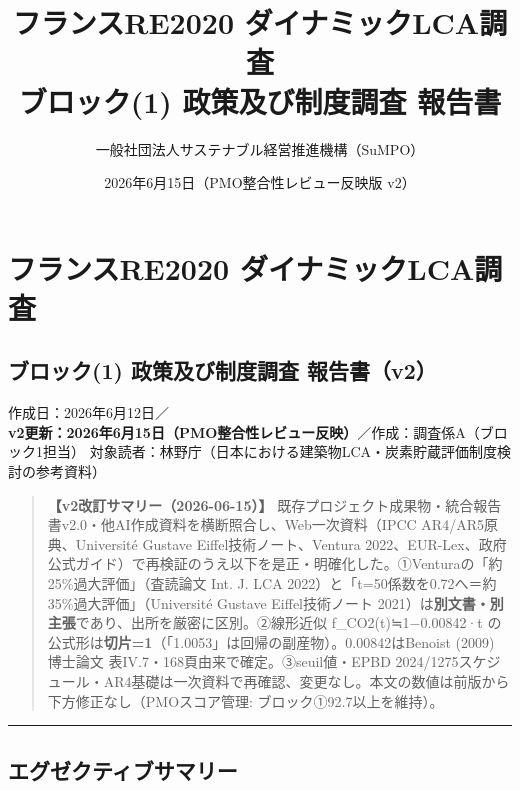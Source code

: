 \documentclass[11pt]{ltjsarticle}
\title{フランスRE2020 ダイナミックLCA調査\\ブロック(1) 政策及び制度調査 報告書}
\author{一般社団法人サステナブル経営推進機構（SuMPO）}
\date{2026年6月15日（PMO整合性レビュー反映版 v2）}
\begin{document}
\maketitle

\hypertarget{ux30d5ux30e9ux30f3ux30b9re2020-ux30c0ux30a4ux30caux30dfux30c3ux30aflcaux8abfux67fb}{%
\section{フランスRE2020
ダイナミックLCA調査}\label{ux30d5ux30e9ux30f3ux30b9re2020-ux30c0ux30a4ux30caux30dfux30c3ux30aflcaux8abfux67fb}}

\hypertarget{ux30d6ux30edux30c3ux30af1-ux653fux7b56ux53caux3073ux5236ux5ea6ux8abfux67fb-ux5831ux544aux66f8v2}{%
\subsection{ブロック(1) 政策及び制度調査
報告書（v2）}\label{ux30d6ux30edux30c3ux30af1-ux653fux7b56ux53caux3073ux5236ux5ea6ux8abfux67fb-ux5831ux544aux66f8v2}}

作成日：2026年6月12日／\textbf{v2更新：2026年6月15日（PMO整合性レビュー反映）}／作成：調査係A（ブロック1担当）
対象読者：林野庁（日本における建築物LCA・炭素貯蔵評価制度検討の参考資料）

\begin{quote}
\textbf{【v2改訂サマリー（2026-06-15）】}
既存プロジェクト成果物・統合報告書v2.0・他AI作成資料を横断照合し、Web一次資料（IPCC
AR4/AR5原典、Université Gustave Eiffel技術ノート、Ventura
2022、EUR-Lex、政府公式ガイド）で再検証のうえ以下を是正・明確化した。①Venturaの「約25\%過大評価」（査読論文
Int. J. LCA 2022）と「t=50係数を0.72へ＝約35\%過大評価」（Université
Gustave Eiffel技術ノート
2021）は\textbf{別文書・別主張}であり、出所を厳密に区別。②線形近似
f\_CO2(t)≒1−0.00842·t
の公式形は\textbf{切片=1}（「1.0053」は回帰の副産物）。0.00842はBenoist
(2009) 博士論文 表IV.7・168頁由来で確定。③seuil値・EPBD
2024/1275スケジュール・AR4基礎は一次資料で再確認、変更なし。本文の数値は前版から下方修正なし（PMOスコア管理:
ブロック①92.7以上を維持）。
\end{quote}

\begin{center}\rule{0.5\linewidth}{0.5pt}\end{center}

\hypertarget{ux30a8ux30b0ux30bcux30afux30c6ux30a3ux30d6ux30b5ux30deux30eaux30fc}{%
\subsection{エグゼクティブサマリー}\label{ux30a8ux30b0ux30bcux30afux30c6ux30a3ux30d6ux30b5ux30deux30eaux30fc}}
\end{document}
